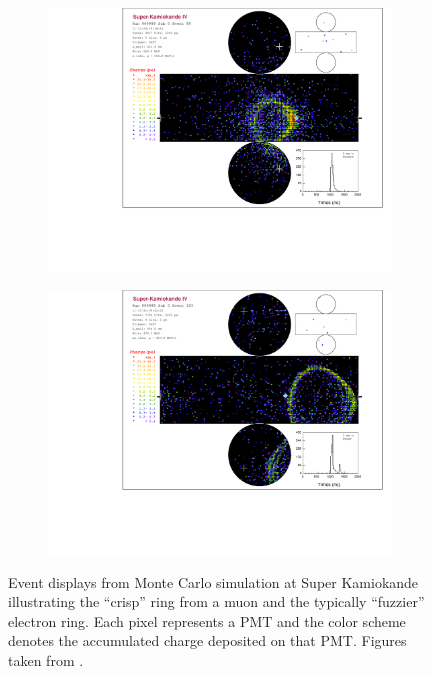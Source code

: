 \begin{figure}[h]
  \begin{subfigure}[t]{0.5\textwidth}
    \includegraphics[width=\textwidth, trim={0mm 0mm 0mm 0mm}, clip,page=1]{Figures/Simulations/NuECandidate.pdf}
  \end{subfigure}%
  \begin{subfigure}[t]{0.5\textwidth}
    \includegraphics[width=\textwidth, trim={0mm 0mm 0mm 0mm}, clip,page=1]{Figures/Simulations/NuMuCandidate.pdf}
    \subcaption{\quickmath{\nu_{\mu}}}
  \end{subfigure}
  \caption{Event displays from Monte Carlo simulation at Super Kamiokande illustrating the ``crisp'' ring from a muon and the typically ``fuzzier'' electron ring. Each pixel represents a PMT and the color scheme denotes the accumulated charge deposited on that PMT. Figures taken from \cite{t2k_tn_219}.}
  \label{fig:Simulations_SKEventDisplays}
\end{figure}

